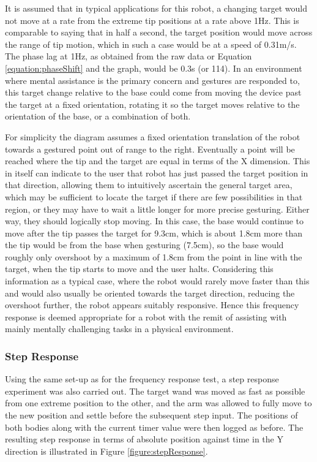 \documentclass[11pt]{article}
\begin{document}
It is assumed that in typical applications for this robot, a changing target would not move at a rate from the extreme tip positions at a rate above 1Hz. This is comparable to saying that in half a second, the target position would move across the range of tip motion, which in such a case would be at a speed of 0.31m/s. The phase lag at 1Hz, as obtained from the raw data or Equation \ref{equation:phaseShift} and the graph, would be 0.3s (or 114\degree). In an environment where mental assistance is the primary concern and gestures are responded to, this target change relative to the base could come from moving the device past the target at a fixed orientation, rotating it so the target moves relative to the orientation of the base, or a combination of both.

For simplicity the diagram assumes a fixed orientation translation of the robot towards a gestured point out of range to the right. Eventually a point will be reached where the tip and the target are equal in terms of the X dimension. This in itself can indicate to the user that robot has just passed the target position in that direction, allowing them to intuitively ascertain the general target area, which may be sufficient to locate the target if there are few possibilities in that region, or they may have to wait a little longer for more precise gesturing. Either way, they should logically stop moving. In this case, the base would continue to move after the tip passes the target for 9.3cm, which is about 1.8cm more than the tip would be from the base when gesturing (7.5cm), so the base would roughly only overshoot by a maximum of 1.8cm  from the point in line with the target, when the tip starts to move and the user halts. Considering this information as a typical case, where the robot would rarely move faster than this and would also usually be oriented towards the target direction, reducing the overshoot further, the robot appears suitably responsive. Hence this frequency response is deemed appropriate for a robot with the remit of assisting with mainly mentally challenging tasks in a physical environment. 



\subsubsection{Step Response}

Using the same set-up as for the frequency response test, a step response experiment was also carried out. The target wand was moved as fast as possible from one extreme position to the other, and the arm was allowed to fully move to the new position and settle before the subsequent step input. The positions of both bodies along with the current timer value were then logged as before. The resulting step response in terms of absolute position against time in the Y direction is illustrated in Figure \ref{figure:stepResponse}.
\end{document}
